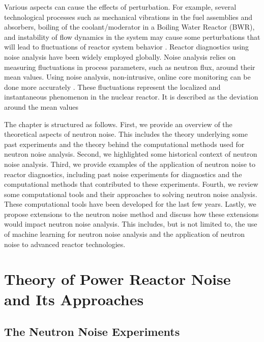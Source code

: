 Various aspects can cause the effects of perturbation. For example, several technological processes such as mechanical vibrations in the fuel assemblies and absorbers, boiling of the coolant/moderator in a Boiling Water Reactor (BWR), and instability of flow dynamics in the system may cause some perturbations that will lead to fluctuations of reactor system behavior \cite{thiePowerReactorNoise1981}. Reactor diagnostics using noise analysis have been widely employed globally. Noise analysis relies on measuring fluctuations in process parameters, such as neutron flux, around their mean values. Using noise analysis, non-intrusive, online core monitoring can be done more accurately \cite{demaziereDevelopmentNonintrusiveMethod2002}. These fluctuations represent the localized and instantaneous phenomenon in the nuclear reactor. It is described as the deviation around the mean values

The chapter is structured as follows. First, we provide an overview of the theoretical aspects of neutron noise. This includes the theory underlying some past experiments and the theory behind the computational methods used for neutron noise analysis. Second, we highlighted some historical context of neutron noise analysis. Third, we provide examples of the application of neutron noise to reactor diagnostics, including past noise experiments for diagnostics and the computational methods that contributed to these experiments. Fourth, we review some computational tools and their approaches to solving neutron noise analysis. These computational tools have been developed for the last few years. Lastly, we propose extensions to the neutron noise method and discuss how these extensions would impact neutron noise analysis. This includes, but is not limited to, the use of machine learning for neutron noise analysis and the application of neutron noise to advanced reactor technologies. 
 
\section{Theory of Power Reactor Noise and Its Approaches}

\subsection{The Neutron Noise Experiments}

